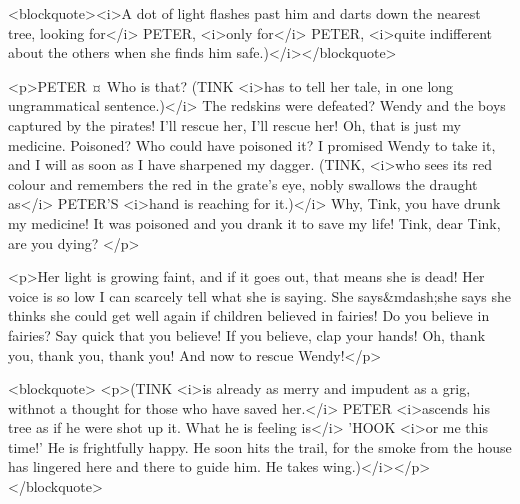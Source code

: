 <blockquote><i>A dot of light flashes past him and darts down the nearest tree, looking for</i> PETER, <i>only for</i> PETER, <i>quite indifferent about the others when she finds him safe.)</i></blockquote>

<p>PETER ¤
Who is that? (TINK <i>has to tell her tale, in one long ungrammatical sentence.)</i> The redskins were defeated? Wendy and the boys captured by the pirates! I'll rescue her, I'll rescue her!
Oh, that is just my medicine. Poisoned? Who could have poisoned it? I promised Wendy to take it, and I will as soon as I have sharpened my dagger. (TINK, <i>who sees its red colour and remembers the red in the grate's eye, nobly swallows the draught as</i> PETER'S <i>hand is reaching for it.)</i> Why, Tink, you have drunk my medicine!
It was poisoned and you drank it to save my life! Tink, dear Tink, are you dying?
</p>

<p>Her light is growing faint, and if it goes out, that means she is dead! Her voice is so low I can scarcely tell what she is saying. She says&mdash;she says she thinks she could get well again if children believed in fairies!
Do you believe in fairies? Say quick that you believe! If you believe, clap your hands!
Oh, thank you, thank you, thank you! And now to rescue Wendy!</p>

<blockquote> <p>(TINK <i>is already as merry and impudent as a grig, withnot a thought for those who have saved her.</i> PETER <i>ascends his tree as if he were shot up it. What he is feeling is</i> 'HOOK <i>or me this time!' He is frightfully happy. He soon hits the trail, for the smoke from the house has lingered here and there to guide him. He takes wing.)</i></p> </blockquote>

